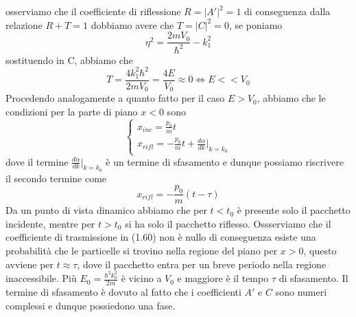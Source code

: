 osserviamo che il coefficiente di riflessione $R = |A'|^2 = 1$ di conseguenza dalla relazione $R + T = 1$ dobbiamo avere che $T = |C|^2 = 0$, se poniamo 
\begin{equation*}
	\eta^2 = \frac{2mV_0}{\hbar^2} - k_1^2 
\end{equation*}
sostituendo in C, abbiamo che 
\begin{equation}
	T = \frac{4k_1^2 \hbar^2}{2mV_0} = \frac{4E}{V_0} \approx 0 \iff E<<V_0 
\end{equation}
Procedendo analogamente a quanto fatto per il caso $E > V_0$, abbiamo che le condizioni per la parte di piano $x < 0 $ sono
\begin{equation*}
	\begin{cases}
		x_{inc} = \frac{p_0}{m}t \\
		x_{rifl} = -\frac{p_0}{m}t +\frac{d\alpha}{dk}|_{k=k_0}
	\end{cases}
\end{equation*}
dove il termine $\frac{d \alpha}{dk}|_{k=k_0}$ \`e un termine di sfasamento e dunque possiamo riscrivere il secondo termine come 
\begin{equation*}
	x_{rifl} = - \frac{p_0}{m}(t-\tau)
\end{equation*}
Da un punto di vista dinamico abbiamo che per $t<t_0$ \`e presente solo il pacchetto incidente, mentre per $t > t_0$ si ha solo il pacchetto riflesso. Ossserviamo che il coefficiente di trasmissione in (1.60) non \`e nullo di conseguenza esiste una probabilit\`a che le particelle si trovino nella regione del piano per $x > 0$, questo avviene per $t \approx \tau$, dove il pacchetto entra per un breve periodo nella regione inaccessibile. Pi\`u $E_0 = \frac{\hbar^2k_0^2}{2m}$ \`e vicino a $V_0$ e maggiore \`e il tempo $\tau$ di sfasamento. Il termine di sfasamento \`e dovuto al fatto che i coefficienti $A'$ e $C$ sono numeri complessi e dunque possiedono una fase.  